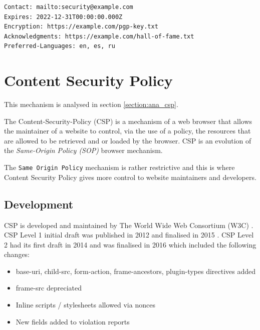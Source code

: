 \documentclass{mscreport}
\begin{document}
\begin{lstlisting}
Contact: mailto:security@example.com
Expires: 2022-12-31T00:00:00.000Z
Encryption: https://example.com/pgp-key.txt
Acknowledgments: https://example.com/hall-of-fame.txt
Preferred-Languages: en, es, ru
\end{lstlisting}

\section{Content Security Policy}
\label{section:bg_csp}

This mechanism is analysed in section \ref{section:ana_csp}.

\vspace{0.3cm} \noindent
The Content-Security-Policy (CSP) is a mechanism of a web browser that allows the maintainer of a website to control, via the use of a policy, the resources that are allowed to be retrieved and or loaded by the browser. CSP is an evolution of the \textit{Same-Origin Policy (SOP)} browser mechanism.

\vspace{0.3cm} \noindent
The \texttt{Same Origin Policy} mechanism is rather restrictive and this is where Content Security Policy gives more control to website maintainers and developers.

\subsection{Development}

CSP is developed and maintained by The World Wide Web Consortium (W3C) \cite{Barth2012-ow}.
CSP Level 1 initial draft was published in 2012 \cite{Barth2012-ow} and finalised in 2015 \cite{Barth2015-ez}.
CSP Level 2 had its first draft in 2014 \cite{West2014-oe} and was finalised in 2016 \cite{West2016-ol} which included the following changes:
\begin{itemize}
  \setlength\itemsep{0.1em}
  \item base-uri, child-src, form-action, frame-ancestors, plugin-types directives added
  \item frame-src depreciated
  \item Inline scripts / stylesheets allowed via nonces
  \item New fields added to violation reports
\end{itemize}
\end{document}
